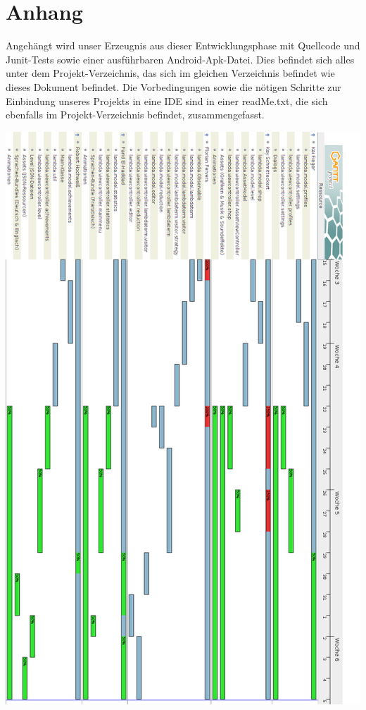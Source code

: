 \section{Anhang}

Angehängt wird unser Erzeugnis aus dieser Entwicklungsphase mit Quellcode und Junit-Tests sowie einer ausführbaren Android-Apk-Datei.
Dies befindet sich alles unter dem Projekt-Verzeichnis, das sich im gleichen Verzeichnis befindet wie dieses Dokument befindet. Die Vorbedingungen sowie die nötigen Schritte zur Einbindung unseres Projekts in eine IDE sind in einer readMe.txt, die sich ebenfalls im Projekt-Verzeichnis befindet, zusammengefasst.

\includegraphics[scale=0.4]{../Implementierungsplan/Implementierungsplan_cut.png} 